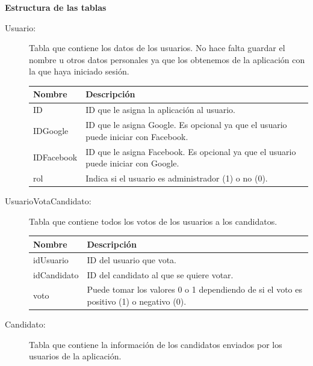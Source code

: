 \newpage

\textbf{Estructura de las tablas}

\begin{description}

\item[Usuario:] Tabla que contiene los datos de los usuarios. No hace falta guardar el nombre u otros datos personales ya que los obtenemos de la aplicación con la que haya iniciado sesión.

\begin{tabularx}{14cm}{|l|X|}
\hline
\textbf{Nombre} & \textbf{Descripción}                                                              \\ \hline
ID              & ID que le asigna la aplicación al usuario.                                         \\ \hline
IDGoogle        & ID que le asigna Google. Es opcional ya que el usuario puede iniciar con Facebook. \\ \hline
IDFacebook      & ID que le asigna Facebook. Es opcional ya que el usuario puede iniciar con Google. \\ \hline
rol      & Indica si el usuario es administrador (1) o no (0). \\ \hline
\end{tabularx}
\vspace{1em}

\item[UsuarioVotaCandidato:] Tabla que contiene todos los votos de los usuarios a los candidatos.

\begin{tabularx}{14cm}{|l|X|}
\hline
\textbf{Nombre} & \textbf{Descripción}                                                              \\ \hline
idUsuario       & ID del usuario que vota.                                                           \\ \hline
idCandidato     & ID del candidato al que se quiere votar.                                           \\ \hline
voto            & Puede tomar los valores 0 o 1 dependiendo de si el voto es positivo (1) o negativo (0). \\ \hline
\end{tabularx}
\vspace{1em}

\item[Candidato:] Tabla que contiene la información de los candidatos enviados por los usuarios de la aplicación.


\end{description}
